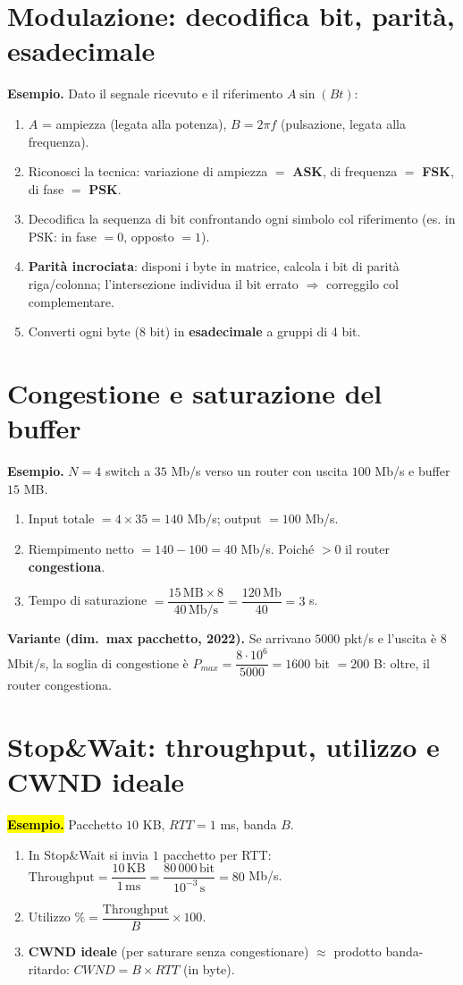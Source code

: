 \documentclass[11pt,a4paper]{report}
\begin{document}
\section{Modulazione: decodifica bit, parità, esadecimale}
\label{teoria:modul}
\textbf{Esempio.} Dato il segnale ricevuto e il riferimento $A\sin(B t)$:
\begin{enumerate}[noitemsep]
\item $A$ = ampiezza (legata alla potenza), $B=2\pi f$ (pulsazione, legata alla frequenza).
\item Riconosci la tecnica: variazione di ampiezza $=$ \textbf{ASK}, di frequenza $=$ \textbf{FSK}, di fase $=$ \textbf{PSK}.
\item Decodifica la sequenza di bit confrontando ogni simbolo col riferimento (es. in PSK: in fase $=0$, opposto $=1$).
\item \textbf{Parità incrociata}: disponi i byte in matrice, calcola i bit di parità riga/colonna; l'intersezione individua il bit errato $\Rightarrow$ correggilo col complementare.
\item Converti ogni byte (8 bit) in \textbf{esadecimale} a gruppi di 4 bit.
\end{enumerate}

\section{Congestione e saturazione del buffer}
\label{teoria:congbuf}
\textbf{Esempio.} $N=4$ switch a $35$ Mb/s verso un router con uscita $100$ Mb/s e buffer $15$ MB.
\begin{enumerate}[noitemsep]
\item Input totale $=4\times35=140$ Mb/s; output $=100$ Mb/s.
\item Riempimento netto $=140-100=40$ Mb/s. Poiché $>0$ il router \textbf{congestiona}.
\item Tempo di saturazione $=\dfrac{15\,\text{MB}\times8}{40\,\text{Mb/s}}=\dfrac{120\,\text{Mb}}{40}=3$ s.
\end{enumerate}
\textbf{Variante (dim.\ max pacchetto, 2022).} Se arrivano $5000$ pkt/s e l'uscita è $8$ Mbit/s, la soglia di congestione è $P_{max}=\dfrac{8\cdot10^6}{5000}=1600$ bit $=200$ B: oltre, il router congestiona.

\section{Stop\&Wait: throughput, utilizzo e CWND ideale}
\label{teoria:stopwait}
\hl{\textbf{Esempio.}} Pacchetto $10$ KB, $RTT=1$ ms, banda $B$.
\begin{enumerate}[noitemsep]
\item In Stop\&Wait si invia $1$ pacchetto per RTT: $\text{Throughput}=\dfrac{10\,\text{KB}}{1\,\text{ms}}=\dfrac{80\,000\,\text{bit}}{10^{-3}\,\text{s}}=80$ Mb/s.
\item Utilizzo $\%=\dfrac{\text{Throughput}}{B}\times100$.
\item \textbf{CWND ideale} (per saturare senza congestionare) $\approx$ prodotto banda-ritardo: $CWND=B\times RTT$ (in byte).
\end{enumerate}
\end{document}

